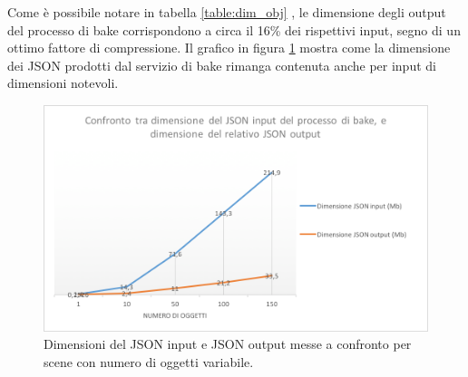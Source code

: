 Come è possibile notare in tabella \ref{table:dim_obj} , le dimensione degli output del processo di bake corrispondono a circa il 16\% dei rispettivi input, segno di un ottimo fattore di compressione. Il grafico in figura \ref{fig:grafico5} mostra come la dimensione dei JSON prodotti dal servizio di bake rimanga contenuta anche per input di dimensioni notevoli.
\\
\begin{figure}[htb]
 \centering
 \includegraphics[width=0.8\linewidth]{images/chapter_prove_sperimentali/grafico5.png}\hfill
 \caption[Confronto dimensioni input-output]{Dimensioni del JSON input e JSON output messe a confronto per scene con numero di oggetti variabile.}
 \label{fig:grafico5}
\end{figure}

